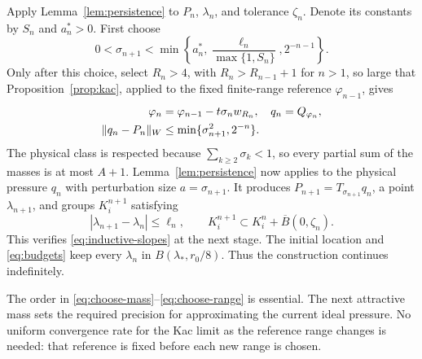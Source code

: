 Apply Lemma~\ref{lem:persistence} to $P_n$, $\lambda_n$, and tolerance
$\zeta_n$. Denote its constants by $S_n$ and $a_n^*>0$. First choose
\begin{equation}\label{eq:choose-mass}
 0<\sigma_{n+1}<
 \min\left\{a_n^*,\frac{\ell_n}{\max\{1,S_n\}},2^{-n-1}\right\}.
\end{equation}
Only after this choice, select $R_n>4$, with $R_n>R_{n-1}+1$ for $n>1$,
so large that Proposition~\ref{prop:kac}, applied to the fixed finite-range
reference $\varphi_{n-1}$, gives
\begin{align}
 \varphi_n&=\varphi_{n-1}-t\sigma_nw_{R_n},
 &q_n&=Q_{\varphi_n},\notag\\
 \|q_n-P_n\|_W&\le\min\{\sigma_{n+1}^2,2^{-n}\}.
 \label{eq:choose-range}
\end{align}
The physical class is respected because
$\sum_{k\ge2}\sigma_k<1$, so every partial sum of the masses is at most
$A+1$. Lemma~\ref{lem:persistence} now applies to the physical pressure
$q_n$ with perturbation size $a=\sigma_{n+1}$. It produces
$P_{n+1}=T_{\sigma_{n+1}}q_n$, a point $\lambda_{n+1}$, and groups
$K_i^{n+1}$ satisfying
\[
 |\lambda_{n+1}-\lambda_n|\le\ell_n,
 \qquad K_i^{n+1}\subset K_i^n+\overline B(0,\zeta_n).
\]
This verifies \eqref{eq:inductive-slopes} at the next stage.
The initial location and \eqref{eq:budgets} keep every $\lambda_n$ in
$B(\lambda_*,r_0/8)$. Thus the construction continues indefinitely.

The order in \eqref{eq:choose-mass}--\eqref{eq:choose-range} is essential.
The next attractive mass sets the required precision for approximating the
current ideal pressure. No uniform convergence rate for the Kac limit as the
reference range changes is needed: that reference is fixed before each new
range is chosen.

